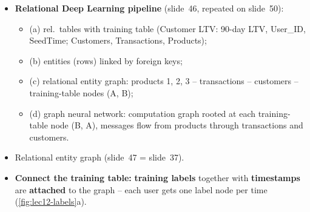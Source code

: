 \begin{itemize}
  \item \textbf{Relational Deep Learning pipeline} (slide~46, repeated on slide~50):
    \begin{itemize}
      \item (a) rel.\ tables with training table (Customer LTV: 90-day LTV, User\_ID,
        SeedTime; Customers, Transactions, Products);
      \item (b) entities (rows) linked by foreign keys;
      \item (c) relational entity graph: products 1, 2, 3 -- transactions -- customers --
        training-table nodes (A, B);
      \item (d) graph neural network: computation graph rooted at each training-table node
        (B, A), messages flow from products through transactions and customers.
    \end{itemize}
  \item Relational entity graph (slide~47 = slide~37).
  \item \textbf{Connect the training table:} \textbf{training labels} together with
    \textbf{timestamps} are \textbf{attached} to the graph -- each user gets one label
    node per time (\cref{fig:lec12-labels}a).
\end{itemize}

